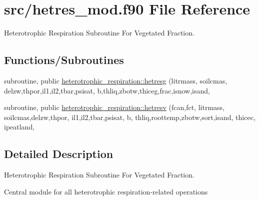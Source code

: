\hypertarget{hetres__mod_8f90}{}\section{src/hetres\+\_\+mod.f90 File Reference}
\label{hetres__mod_8f90}


Heterotrophic Respiration Subroutine For Vegetated Fraction.  


\subsection*{Functions/\+Subroutines}
{\bf }\par
\begin{DoxyCompactItemize}
\item 
subroutine, public \hyperlink{group__hetresg_gaf35383e36392dff7ca33ff9022cb70c0}{heterotrophic\+\_\+respiration\+::hetresg} (litrmass, soilcmas, delzw,thpor,il1,il2,tbar,psisat, b,thliq,zbotw,thiceg,frac,isnow,isand,
\end{DoxyCompactItemize}

{\bf }\par
\begin{DoxyCompactItemize}
\item 
subroutine, public \hyperlink{group__hetresv_gabafd1229b9f5bc311e761b6ce707025a}{heterotrophic\+\_\+respiration\+::hetresv} (fcan,fct, litrmass, soilcmas,delzw,thpor, il1,il2,tbar,psisat, b, thliq,roottemp,zbotw,sort,isand, thicec, ipeatland,
\end{DoxyCompactItemize}



\subsection{Detailed Description}
Heterotrophic Respiration Subroutine For Vegetated Fraction. 

Central module for all heterotrophic respiration-\/related operations 